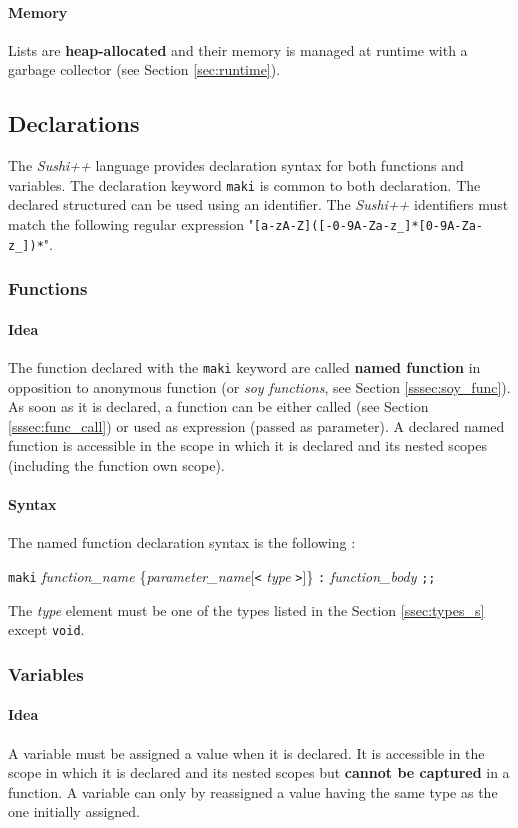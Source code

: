\documentclass[a4paper,11pt]{article}
\begin{document}
\paragraph{Memory} Lists are \textbf{heap-allocated} and their memory is managed at runtime with a garbage collector (see Section \ref{sec:runtime}).

\subsection{Declarations}

The \textit{Sushi++} language provides declaration syntax for both functions and variables. The declaration keyword \texttt{maki} is common to both declaration. The declared structured can be used using an identifier. The \textit{Sushi++} identifiers must match the following regular expression "\texttt{{[a-zA-Z]}({[-0-9A-Za-z\_]}*{[0-9A-Za-z\_]})*}".
\subsubsection{Functions}
\label{sssec:decl_func}
\paragraph{Idea} The function declared with the \texttt{maki} keyword are called \textbf{named function} in opposition to anonymous function (or \textit{soy functions}, see Section \ref{sssec:soy_func}). As soon as it is declared, a function can be either called (see Section \ref{sssec:func_call}) or used as expression (passed as parameter). A declared named function is accessible in the scope in which it is declared and its nested scopes (including the function own scope).
\paragraph{Syntax}  The named function declaration syntax is the following :
\begin{center}
\texttt{maki} \textit{function\_name} \{\textit{parameter\_name}[\texttt{<} \textit{type} \texttt{>}]\} \texttt{:} \textit{function\_body} \texttt{;;}
\end{center}
The \textit{type} element must be one of the types listed in the Section \ref{ssec:types_s} except \texttt{void}.
\subsubsection{Variables}
\paragraph{Idea} A variable must be assigned a value when it is declared. It is accessible in the scope in which it is declared and its nested scopes but \textbf{cannot be captured} in a function. A variable can only by reassigned a value having the same type as the one initially assigned.
\end{document}
